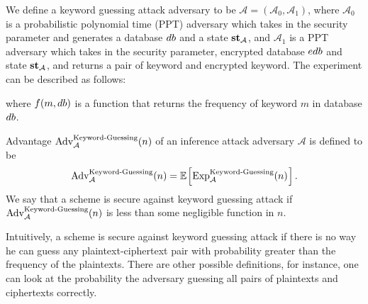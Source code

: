 \begin{definition} \label{Security against Keyword Guessing Attack}
We define a keyword guessing attack adversary to be $\mathcal{A} = (\mathcal{A}_0, \mathcal{A}_1)$, where $\mathcal{A}_0$ is a probabilistic polynomial time (PPT) adversary which takes in the security parameter and generates a database $db$ and a state $\textbf{st}_{\mathcal{A}}$, and $\mathcal{A}_1$ is a PPT adversary which takes in the security parameter, encrypted database $edb$ and state $\textbf{st}_{\mathcal{A}}$, and returns a pair of keyword and encrypted keyword. The experiment can be described as follows:

\begin{pchstack}[center]
\end{pchstack}
where $f(m, db)$ is a function that returns the frequency of keyword $m$ in database $db$.

Advantage $\text{Adv}_{\mathcal{A}}^{\text{Keyword-Guessing}}(n)$ of an inference attack adversary $\mathcal{A}$ is defined to be
\begin{equation}
	\advantage_{\mathcal{A}}^{\text{Keyword-Guessing}}(n) = \expect{\text{Exp}_{\adv}^{\text{Keyword-Guessing}}(n)}.
\end{equation}
We say that a scheme is secure against keyword guessing attack if $\text{Adv}_{\mathcal{A}}^{\text{Keyword-Guessing}}(n)$ is less than some negligible function in $n$.
\end{definition}


Intuitively, a scheme is secure against keyword guessing attack if there is no way he can guess any plaintext-ciphertext pair with probability greater than the frequency of the plaintexts. There are other possible definitions, for instance, one can look at the probability the adversary guessing all pairs of plaintexts and ciphertexts correctly.

